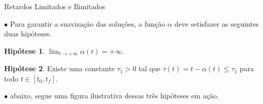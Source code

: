 \documentclass{beamer}
\theoremstyle{plain}
\theoremstyle{definition}
\newtheorem{hip}{Hipótese}
\begin{document}
%
%
%



\begin{frame}{Retardos Limitados e Ilimitados}
    
    $\bullet$ Para garantir a suavização das soluções, a função $\alpha$ deve setisfazer as seguintes duas hipóteses.

    \begin{hip}
        \label{H2:hipotese:hypothesis}
        $\lim _{t \rightarrow+\infty} \alpha(t)=+\infty$.
    \end{hip}


    \begin{hip}
        \label{H3:hipotese:hypothesis}
        Existe uma constante \(\tau_{1}>0\) tal que \(\tau(t)=t-\alpha(t) \leq \tau_{1}\) para todo \(t \in\left[t_{0}, t_{f}\right]\).
    \end{hip}

    $\bullet$ abaixo, segue uma figura ilustrativa dessas três hipóteses em ação.

\end{frame}



\end{document}
